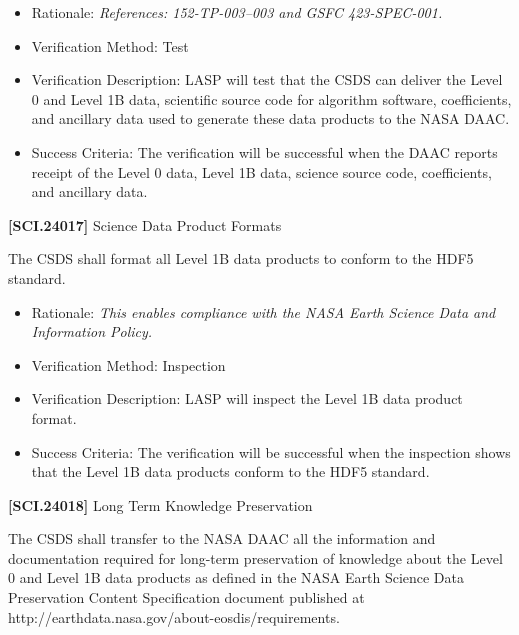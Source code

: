 \begin{itemize}
\item{} Rationale: \emph{References: 152-TP-003--003 and GSFC 423-SPEC-001.}

\item{} Verification Method: Test

\item{} Verification Description: \gls{LASP} will \gls{test} that the \gls{CSDS} can deliver the Level 0 and Level 1B data, scientific source code for algorithm software, coefficients, and ancillary data used to generate these data products to the NASA \gls{DAAC}.

\item{} Success Criteria: The verification will be successful when the \gls{DAAC} reports receipt of the Level 0 data, Level 1B data, science source code, coefficients, and ancillary data.

\end{itemize}

\textbf{[SCI.24017]} Science Data Product Formats

The \gls{CSDS} shall format all Level 1B data products to conform to the HDF5 standard.

\begin{itemize}
\item{} Rationale: \emph{This enables compliance with the NASA Earth Science Data and Information Policy.}

\item{} Verification Method: Inspection

\item{} Verification Description: \gls{LASP} will inspect the Level 1B data product format.

\item{} Success Criteria: The verification will be successful when the \gls{inspection} shows that the Level 1B data products conform to the HDF5 standard.

\end{itemize}

\textbf{[SCI.24018]} Long Term Knowledge Preservation

The \gls{CSDS} shall transfer to the NASA \gls{DAAC} all the information and documentation required for long-term preservation of knowledge about the Level 0 and Level 1B data products as defined in the NASA Earth Science Data Preservation Content Specification document published at http:\slash \slash earthdata.nasa.gov\slash about-eosdis\slash requirements.

